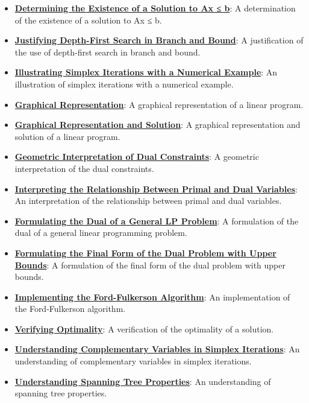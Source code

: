 \documentclass{article}%
\begin{document}
\begin{itemize}[leftmargin=*]
\item \href{https://www.math.purdue.edu/~yipn/421/2024-12-03-Duality.pdf#page=1}{\textbf{Determining the Existence of a Solution to Ax ≤ b}}: A determination of the existence of a solution to Ax ≤ b. %
\item \href{https://www.math.purdue.edu/~yipn/421/2024-12-03-Duality.pdf#page=1}{\textbf{Justifying Depth{-}First Search in Branch and Bound}}: A justification of the use of depth-first search in branch and bound. %
\item \href{https://www.math.purdue.edu/~yipn/421/2024-12-03-Duality.pdf#page=1}{\textbf{Illustrating Simplex Iterations with a Numerical Example}}: An illustration of simplex iterations with a numerical example. %
\item \href{https://www.math.purdue.edu/~yipn/421/2024-12-03-Duality.pdf#page=1}{\textbf{Graphical Representation}}: A graphical representation of a linear program. %
\item \href{https://www.math.purdue.edu/~yipn/421/2024-12-03-Duality.pdf#page=1}{\textbf{Graphical Representation and Solution}}: A graphical representation and solution of a linear program. %
\item \href{https://www.math.purdue.edu/~yipn/421/2024-12-03-Duality.pdf#page=1}{\textbf{Geometric Interpretation of Dual Constraints}}: A geometric interpretation of the dual constraints. %
\item \href{https://www.math.purdue.edu/~yipn/421/2024-12-03-Duality.pdf#page=1}{\textbf{Interpreting the Relationship Between Primal and Dual Variables}}: An interpretation of the relationship between primal and dual variables. %
\item \href{https://www.math.purdue.edu/~yipn/421/2024-12-03-Duality.pdf#page=1}{\textbf{Formulating the Dual of a General LP Problem}}: A formulation of the dual of a general linear programming problem. %
\item \href{https://www.math.purdue.edu/~yipn/421/2024-12-03-Duality.pdf#page=1}{\textbf{Formulating the Final Form of the Dual Problem with Upper Bounds}}: A formulation of the final form of the dual problem with upper bounds. %
\item \href{https://www.math.purdue.edu/~yipn/421/2024-12-03-Duality.pdf#page=1}{\textbf{Implementing the Ford{-}Fulkerson Algorithm}}: An implementation of the Ford-Fulkerson algorithm. %
\item \href{https://www.math.purdue.edu/~yipn/421/2024-12-03-Duality.pdf#page=1}{\textbf{Verifying Optimality}}: A verification of the optimality of a solution. %
\item \href{https://www.math.purdue.edu/~yipn/421/2024-12-03-Duality.pdf#page=1}{\textbf{Understanding Complementary Variables in Simplex Iterations}}: An understanding of complementary variables in simplex iterations. %
\item \href{https://www.math.purdue.edu/~yipn/421/2024-12-03-Duality.pdf#page=1}{\textbf{Understanding Spanning Tree Properties}}: An understanding of spanning tree properties. %
\end{itemize}
\end{document}

